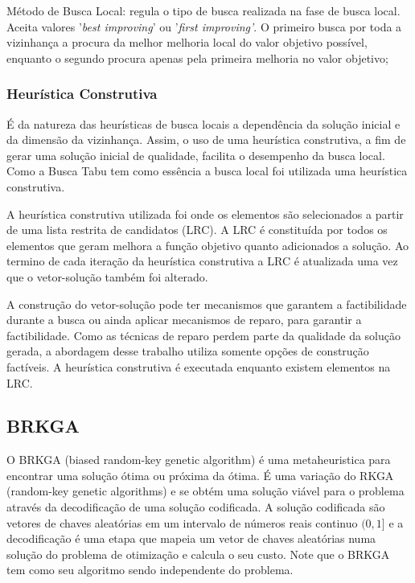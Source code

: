 \documentclass[12pt,a4paper]{article}
\begin{document}
        Método de Busca Local: regula o tipo de busca realizada na fase de busca local. Aceita valores '\textit{best improving}' ou '\textit{first improving'}. O primeiro busca por toda a vizinhança
        a procura da melhor melhoria local do valor objetivo possível, enquanto o segundo procura apenas pela primeira melhoria no valor objetivo;

    \subsubsection{Heurística Construtiva}

        É da natureza das heurísticas de busca locais a dependência da solução inicial e da dimensão da vizinhança. Assim, o uso de uma heurística construtiva, a fim de gerar uma solução inicial de
        qualidade, facilita o desempenho da busca local. Como a Busca Tabu tem como essência a busca local foi utilizada uma heurística construtiva.


        A heurística construtiva utilizada foi onde os elementos são selecionados a partir de uma lista restrita de candidatos (LRC). A LRC é constituída por todos os elementos que geram
        melhora a função objetivo quanto adicionados a solução. Ao termino de cada iteração da heurística construtiva a LRC é atualizada uma vez que o vetor-solução também foi alterado.


        A construção do vetor-solução pode ter mecanismos que garantem a factibilidade durante a busca ou ainda aplicar mecanismos de reparo, para garantir a factibilidade. Como as técnicas de
        reparo perdem parte da qualidade da solução gerada, a abordagem desse trabalho utiliza somente opções de construção factíveis. A heurística construtiva é executada enquanto existem elementos
        na LRC.

        


\subsection{BRKGA}
O BRKGA (biased random-key genetic algorithm)\cite{gonccalves2011biased} é uma metaheuristica para encontrar uma solução ótima ou próxima da ótima. É uma variação do RKGA
(random-key genetic algorithms) \cite{bean1994genetic} e se obtém uma solução viável para o problema através da decodificação de uma solução codificada. A solução codificada são vetores de
chaves aleatórias em um intervalo de números reais continuo $(0,1]$ e a decodificação é uma etapa que mapeia um vetor de chaves aleatórias numa solução do problema de otimização e calcula o
seu custo. Note que o BRKGA tem como seu algoritmo sendo independente do problema. 
\end{document}
